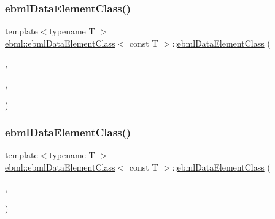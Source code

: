 \subsubsection{\texorpdfstring{ebml\+Data\+Element\+Class()}{ebmlDataElementClass()}\hspace{0.1cm}{\footnotesize\ttfamily [3/6]}}
{\footnotesize\ttfamily template$<$typename T $>$ \\
\mbox{\hyperlink{classebml_1_1ebmlDataElementClass}{ebml\+::ebml\+Data\+Element\+Class}}$<$ const T $>$\+::\mbox{\hyperlink{classebml_1_1ebmlDataElementClass}{ebml\+Data\+Element\+Class}} (\begin{DoxyParamCaption}\item[{const char $\ast$}]{,  }\item[{const std\+::wstring \&}]{,  }\item[{T \&\&}]{ }\end{DoxyParamCaption})}

\mbox{\label{classebml_1_1ebmlDataElementClass_3_01const_01T_01_4_a83d68654ada83eb978d50133b93df485}} 
\subsubsection{\texorpdfstring{ebml\+Data\+Element\+Class()}{ebmlDataElementClass()}\hspace{0.1cm}{\footnotesize\ttfamily [4/6]}}
{\footnotesize\ttfamily template$<$typename T $>$ \\
\mbox{\hyperlink{classebml_1_1ebmlDataElementClass}{ebml\+::ebml\+Data\+Element\+Class}}$<$ const T $>$\+::\mbox{\hyperlink{classebml_1_1ebmlDataElementClass}{ebml\+Data\+Element\+Class}} (\begin{DoxyParamCaption}\item[{\mbox{\hyperlink{namespaceebml_a86c5f604ddf12a74aa9812e997a58691}{ebml\+I\+D\+\_\+t}}}]{,  }\item[{const std\+::wstring \&}]{ }\end{DoxyParamCaption})}

\mbox{\label{classebml_1_1ebmlDataElementClass_3_01const_01T_01_4_afabeada87b7b2a7fd9a5944b8534cb5d}} 
